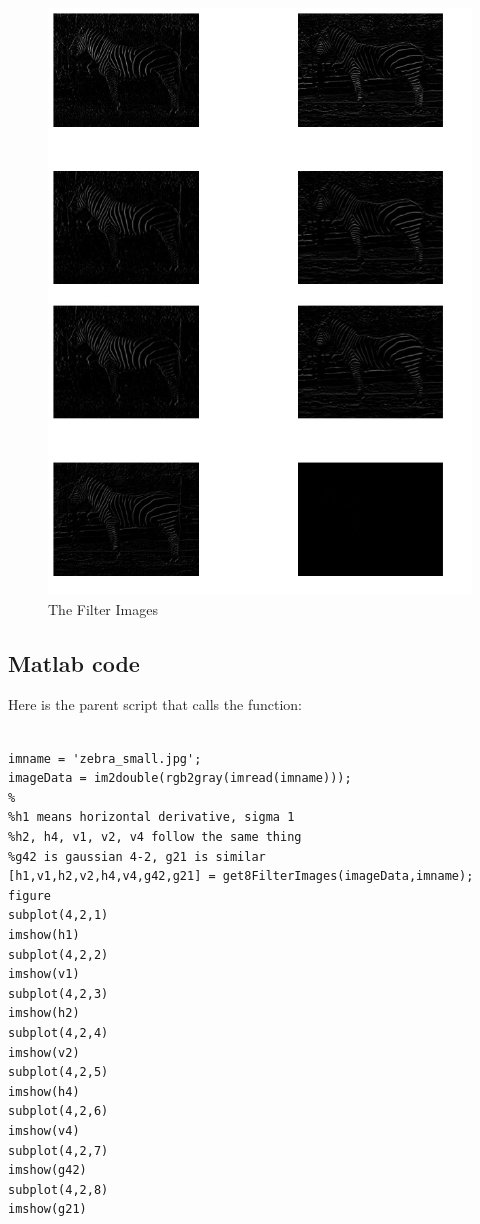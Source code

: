 \documentclass[11pt,psfig]{article}
\begin{document}
\begin{figure}[H]
\centering
\includegraphics[width=7in]{prob2filterImages.jpg}
\caption{The Filter Images}
\end{figure}

\subsection*{Matlab code}

Here is the parent script that calls the function:

\begin{verbatim}

imname = 'zebra_small.jpg';
imageData = im2double(rgb2gray(imread(imname)));
%
%h1 means horizontal derivative, sigma 1
%h2, h4, v1, v2, v4 follow the same thing
%g42 is gaussian 4-2, g21 is similar
[h1,v1,h2,v2,h4,v4,g42,g21] = get8FilterImages(imageData,imname);
figure
subplot(4,2,1)
imshow(h1)
subplot(4,2,2)
imshow(v1)
subplot(4,2,3)
imshow(h2)
subplot(4,2,4)
imshow(v2)
subplot(4,2,5)
imshow(h4)
subplot(4,2,6)
imshow(v4)
subplot(4,2,7)
imshow(g42)
subplot(4,2,8)
imshow(g21)

\end{verbatim}
\end{document}
